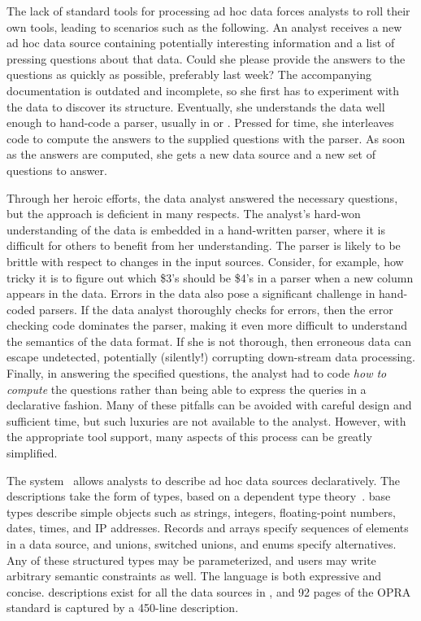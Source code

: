 The lack of standard tools for processing ad hoc data forces
analysts to roll their own tools, leading to scenarios such as the
following.  An analyst receives a new ad hoc data source containing
potentially interesting information and a list of pressing questions
about that data.  Could she please provide the answers to the
questions as quickly as possible, preferably last week?  The
accompanying documentation is outdated and incomplete, so she first has to experiment with the data to discover
its structure.   Eventually, she understands the data well enough to hand-code a
parser, usually in \C{} or \perl{}.  Pressed for time, she interleaves
code to compute the answers to the supplied questions with the parser.
As soon as the answers are computed, she gets a new data source and a
new set of questions to answer.

Through her heroic efforts, the data analyst answered the necessary
questions, but the approach is deficient in many respects.  The
analyst's hard-won understanding of the data is embedded in a
hand-written parser, where it is difficult for others to benefit from
her understanding.  The parser is likely to be brittle with respect to
changes in the input sources.  Consider, for example, how tricky it is
to figure out which \$3's should be \$4's in a \perl{} parser when a
new column appears in the data.  Errors in the data also pose a
significant challenge in hand-coded parsers.  If the data analyst
thoroughly checks for errors, then the error checking code dominates
the parser, making it even more difficult to understand the semantics
of the data format.  If she is not thorough, then erroneous data can
escape undetected, potentially (silently!)  corrupting down-stream
data processing.  Finally, in
answering the specified questions, the analyst had to code \textit{how
to compute} the questions rather than being able to express the
queries in a declarative fashion.  Many of these pitfalls
can be avoided with careful design and sufficient time, but such
luxuries are not available to the analyst.  However, with the
appropriate tool support, many aspects of this process can be greatly
simplified.

The \pads{} system~\cite{fisher+:pldi05} allows analysts to describe
ad hoc data sources declaratively.  The descriptions take the form of
types, based on a dependent type theory~\cite{fisher+:popl06}.
\pads{} base types describe simple objects such as strings,
integers, floating-point numbers, dates, times, and IP addresses.
Records and arrays specify sequences of elements in a data source, and
unions, switched unions, and enums specify alternatives.  Any of these
structured types may be parameterized, and users may write arbitrary
semantic constraints as well.  The \pads{} language is both expressive
and concise.  \pads{} descriptions exist for all the data sources in
, and 92 pages of the OPRA standard is
captured by a 450-line \pads{} description.

